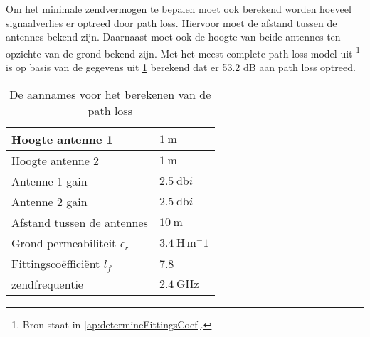 Om het minimale zendvermogen te bepalen moet ook berekend worden hoeveel signaalverlies er optreed door path loss. Hiervoor moet de afstand tussen de antennes bekend zijn. Daarnaast moet ook de hoogte van beide antennes ten opzichte van de grond bekend zijn. Met het meest complete path loss model uit \cite{determineFittingsCoef}
\footnote{Bron \cite{determineFittingsCoef} staat in \cref{ap:determineFittingsCoef}.}
is op basis van de gegevens uit \cref{tab:gegevensCalcPathLoss} berekend dat er 53.2 dB aan path loss optreed.
\begin{table}[!htbp]
    \centering
    \begin{tabular}{l|l}
        Hoogte antenne 1                    & $\qty{1  }{\meter}$               \\\hline
        Hoogte antenne 2                    & $\qty{1  }{\meter}$               \\\hline
        Antenne 1 gain                      & $\qty{2.5}{\decibel i}$           \\\hline
        Antenne 2 gain                      & $\qty{2.5}{\decibel i}$           \\\hline
        Afstand tussen de antennes          & $\qty{10 }{\meter}$               \\\hline
        Grond permeabiliteit $\epsilon_r$   & $\qty{3.4}{\henry\,\meter^-1}$    \\\hline
        Fittingscoëfficiënt $l_f$           & 7.8                               \\\hline
        zendfrequentie                      & $\qty{2.4}{\giga\hertz}$
    \end{tabular}
    \caption{De aannames voor het berekenen van de path loss}
    \label{tab:gegevensCalcPathLoss}
\end{table}

